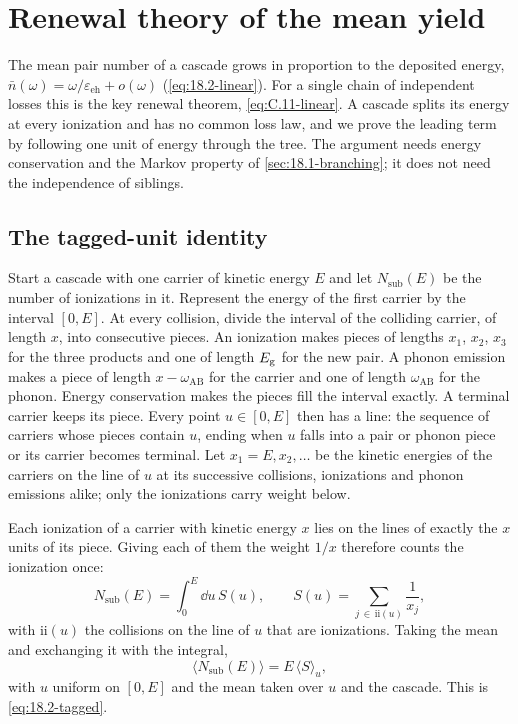 \section{Renewal theory of the mean yield}\label{app:D.44}

The mean pair number of a cascade grows in proportion to the deposited energy, $\bar n(\omega) = \omega/\varepsilon_{\mathrm{eh}} + o(\omega)$ (\cref{eq:18.2-linear}). For a single chain of independent losses this is the key renewal theorem, \cref{eq:C.11-linear}. A cascade splits its energy at every ionization and has no common loss law, and we prove the leading term by following one unit of energy through the tree. The argument needs energy conservation and the Markov property of \cref{sec:18.1-branching}; it does not need the independence of siblings.

\subsection{The tagged-unit identity}

Start a cascade with one carrier of kinetic energy $E$ and let $N_{\mathrm{sub}}(E)$ be the number of ionizations in it. Represent the energy of the first carrier by the interval $[0, E]$. At every collision, divide the interval of the colliding carrier, of length $x$, into consecutive pieces. An ionization makes pieces of lengths $x_1$, $x_2$, $x_3$ for the three products and one of length $E_{\mathrm{g}}$ for the new pair. A phonon emission makes a piece of length $x - \omega_{\mathrm{AB}}$ for the carrier and one of length $\omega_{\mathrm{AB}}$ for the phonon. Energy conservation makes the pieces fill the interval exactly. A terminal carrier keeps its piece. Every point $u \in [0, E]$ then has a line: the sequence of carriers whose pieces contain $u$, ending when $u$ falls into a pair or phonon piece or its carrier becomes terminal. Let $x_1 = E, x_2, \dots$ be the kinetic energies of the carriers on the line of $u$ at its successive collisions, ionizations and phonon emissions alike; only the ionizations carry weight below.

Each ionization of a carrier with kinetic energy $x$ lies on the lines of exactly the $x$ units of its piece. Giving each of them the weight $1/x$ therefore counts the ionization once:
\begin{equation*}
  N_{\mathrm{sub}}(E) = \int_0^E\dd u\,S(u) , \qquad
  S(u) = \sum_{j\,\in\,\mathrm{ii}(u)}\frac{1}{x_j} ,
\end{equation*}
with $\mathrm{ii}(u)$ the collisions on the line of $u$ that are ionizations. Taking the mean and exchanging it with the integral,
\begin{equation}
  \langle N_{\mathrm{sub}}(E)\rangle = E\,\langle S\rangle_u ,
  \label{eq:D.44-tagged}
\end{equation}
with $u$ uniform on $[0, E]$ and the mean taken over $u$ and the cascade. This is \cref{eq:18.2-tagged}.

